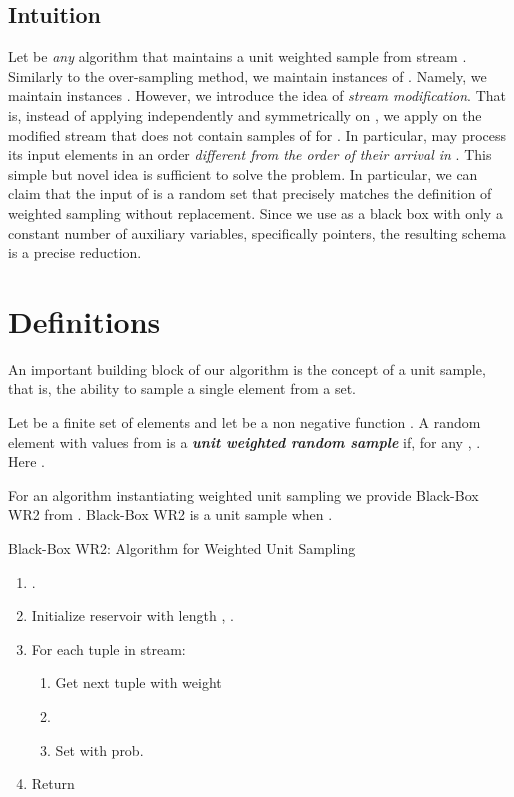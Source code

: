 \documentclass{llncs}
\begin{document}
\subsection{Intuition}

Let  be \emph{any} algorithm that maintains a unit weighted sample from stream .
Similarly to the over-sampling method, we maintain instances of . Namely, we maintain  instances . However, we introduce the idea of \emph{stream modification}. That is, instead of applying  independently and symmetrically on , we apply  on the modified stream  that does not contain samples of  for .
In particular,  may process its input elements in an order \emph{different from the order of their arrival in }.
This simple but novel idea is sufficient to solve the problem.
In particular, we can claim that the input of  is a random set that precisely matches the definition of weighted sampling without replacement. Since we use  as a black box with only a constant number of auxiliary variables, specifically pointers,
the resulting schema is a precise reduction.





\section{Definitions}

An important building block of our algorithm is the concept of a unit sample, that is, the ability to sample a single element from a set. 

\begin{definition}
Let  be a finite set of elements and let  be a non negative function .
A random element  with values from  is a \emph{\textbf{unit weighted random sample}} if, for any ,
. Here .
\end{definition}


For an algorithm instantiating weighted unit sampling we provide Black-Box WR2 from \cite{joins}. Black-Box WR2 is a unit sample when . 

\begin{algorithm}[H]\label{j}
\caption{Black-Box WR2: Algorithm for Weighted Unit Sampling}

\begin{enumerate}
\item .
\item Initialize reservoir with length , .


\item For each tuple  in stream:
\begin{enumerate}
\item Get next tuple  with weight 
\item 
\item Set  with prob. 
\end{enumerate}


\item Return 
\end{enumerate}

\end{algorithm}
\end{document}
